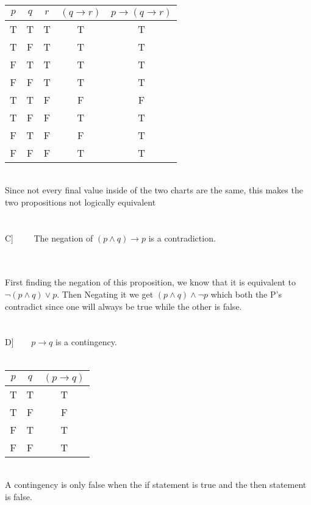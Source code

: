 \documentclass[9pt]{article}
\begin{document}
	\\
	\begin{tabular}{| c | c | c | c | c |}
	\hline
		$p$ & $q$ & $r$ & $(q \to r)$ & $ p \to (q \to r)$\\ \hline
		T & T & T & T &  T\\ \hline
		T & F & T & T &  T\\ \hline
		F & T & T & T &  T\\ \hline
		F & F & T & T &  T\\ \hline
		T & T & F & F &  F\\ \hline
		T & F & F & T &  T\\ \hline
		F & T & F & F & T \\ \hline
		F & F & F & T &  T\\ \hline
	\end{tabular} \\ Since not every final value inside of the two charts are the same, this makes the two propositions not logically equivalent\\
	\\
\\
C] $\phantom{xxx}$ The negation of $(p\land q)\to p$ is a contradiction.\\ \\
 \\ First finding the negation of this proposition, we know that it is equivalent to $ \lnot (p \land q) \lor p$. Then Negating it we get $(p \land q)  \land \lnot p$ which both the P's contradict since one will always be true while the other is false.\\ 
\\ \\
D] $\phantom{xxx}p\to q$ is a contingency.
\\ \\
\begin{tabular}{| c | c | c |}
	\hline
		$p$ & $q$ & $(p \to q)$\\ \hline
		T & T & T\\ \hline
		T & F & F \\ \hline
		F & T & T \\ \hline
		F & F & T \\ \hline
	\end{tabular} \\ A contingency is only false when the if statement is true and the then statement is false. \\
\end{document}
